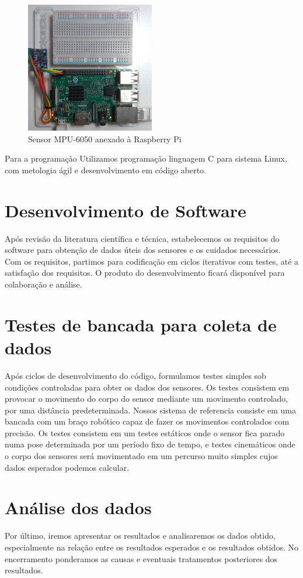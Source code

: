 \begin{figure}[H]
    \centering
    \caption{Sensor MPU-6050 anexado à Raspberry Pi}\label{fig:mpu6050-proto-top}
    \includegraphics[width=0.5\textwidth]{figuras/mpu6050-proto-top.jpg}
\end{figure}

Para a programação Utilizamos programação linguagem C para sistema Linux, com metologia ágil e desenvolvimento em código aberto.

\section{Desenvolvimento de Software}

Após revisão da literatura científica e técnica, estabelecemos os requisitos do software para obtenção de dados úteis dos sensores e os cuidados necessários. Com os requisitos, partimos para codificação em ciclos iterativos com testes, até a satisfação dos requisitos. O produto do desenvolvimento ficará disponível para colaboração e análise.

\section{Testes de bancada para coleta de dados}

Após ciclos de desenvolvimento do código, formulamos testes simples sob condições controladas para obter os dados dos sensores. Os testes consistem em provocar o movimento do corpo do sensor mediante um movimento controlado, por uma distância predeterminada. Nossos sistema de referencia consiste em uma bancada com um braço robótico capaz de fazer os movimentos controlados com precisão. Os testes consistem em um testes estáticos onde o sensor fica parado numa pose determinada por um período fixo de tempo, e testes cinemáticos onde o corpo dos sensores será movimentado em um percurso muito simples cujos dados esperados podemos calcular.

\section{Análise dos dados}

Por último, iremos apresentar os resultados e analisaremos os dados obtido, especialmente na relação entre os resultados esperados e os resultados obtidos. No encerramento ponderamos as causas e eventuais tratamentos posteriores dos resultados.
